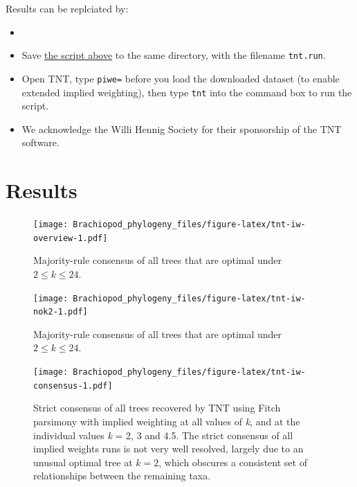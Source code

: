 \documentclass[openany]{book}
\providecommand{\tightlist}{%
  \setlength{\itemsep}{0pt}\setlength{\parskip}{0pt}}
\begin{document}
Results can be replciated by:

\begin{itemize}
\item
\item
  Save
  \href{https://raw.githubusercontent.com/ms609/hyoliths/master/tnt.run}{the
  script above} to the same directory, with the filename
  \texttt{tnt.run}.
\item
  Open TNT, type \texttt{piwe=} before you load the downloaded dataset
  (to enable extended implied weighting), then type \texttt{tnt} into
  the command box to run the script.
\item
  We acknowledge the Willi Hennig Society for their sponsorship of the
  TNT software.
\end{itemize}

\section{Results}\label{results}




\begin{figure}
\centering
\texttt{[image: Brachiopod\_phylogeny\_files/figure-latex/tnt-iw-overview-1.pdf]}
\caption{\label{fig:tnt-iw-overview}Majority-rule consensus of all trees that are optimal
under \(2 \leq k \leq 24\).}
\end{figure}




\begin{figure}
\centering
\texttt{[image: Brachiopod\_phylogeny\_files/figure-latex/tnt-iw-nok2-1.pdf]}
\caption{\label{fig:tnt-iw-nok2}Majority-rule consensus of all trees that are optimal
under \(2 \leq k \leq 24\).}
\end{figure}









\begin{figure}
\centering
\texttt{[image: Brachiopod\_phylogeny\_files/figure-latex/tnt-iw-consensus-1.pdf]}
\caption{\label{fig:tnt-iw-consensus}Strict consensus of all trees recovered by TNT
using Fitch parsimony with implied weighting at all values of \emph{k}, and at the individual
values \emph{k} = 2, 3 and 4.5.
The strict consensus of all implied weights
runs is not very well resolved, largely due to an unusual optimal tree
at \(k = 2\), which obscures a consistent set of relationships between
the remaining taxa.}
\end{figure}
\end{document}
